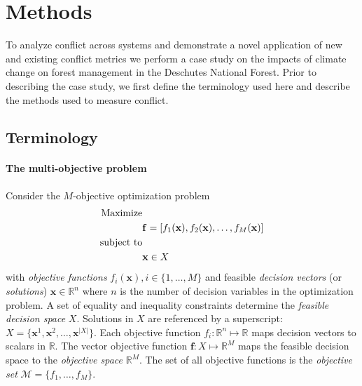 \section{Methods}
\label{sec:methods}
To analyze conflict across systems and demonstrate a novel application of new and existing conflict metrics we perform a case study on the impacts of climate change on forest management in the Deschutes National Forest. Prior to describing the case study, we first define the terminology used here and describe the methods used to measure conflict.

\subsection{Terminology}
\label{subsec:terminology}
  
\paragraph{The multi-objective problem}
Consider the $M$-objective optimization problem
\begin{align}
\text{Maximize}& \notag \\
& \mathbf{f} = [f_1(\mathbf{x}), f_2(\mathbf{x}), \ldots, f_M(\mathbf{x}) ] \label{eqn:generalObj}\\
\text{subject to}& \notag \\
& \mathbf{x} \in X \label{eqn:generalConstraint}
\end{align}
with \textit{objective functions} $f_i(\mathbf{x}), i \in \{1,\ldots,M\}$ and feasible \textit{decision vectors} (or \textit{solutions}) $\mathbf{x} \in \mathbb{R}^n$ where $n$ is the number of decision variables in the optimization problem. A set of equality and inequality constraints determine the \textit{feasible decision space} $X$. Solutions in $X$ are referenced by a superscript: $X = \{\mathbf{x}^1,\mathbf{x}^2,\ldots,\mathbf{x}^{|X|}\}$. Each objective function $f_i : \mathbb{R}^n \mapsto \mathbb{R}$ maps decision vectors to scalars in $\mathbb{R}$. The vector objective function $\mathbf{f} : X \mapsto \mathbb{R}^M$ maps the feasible decision space to the \textit{objective space} $\mathbb{R}^M$. The set of all objective functions is the \textit{objective set} $\mathcal{M} = \{f_1,\ldots,f_M\}$.

